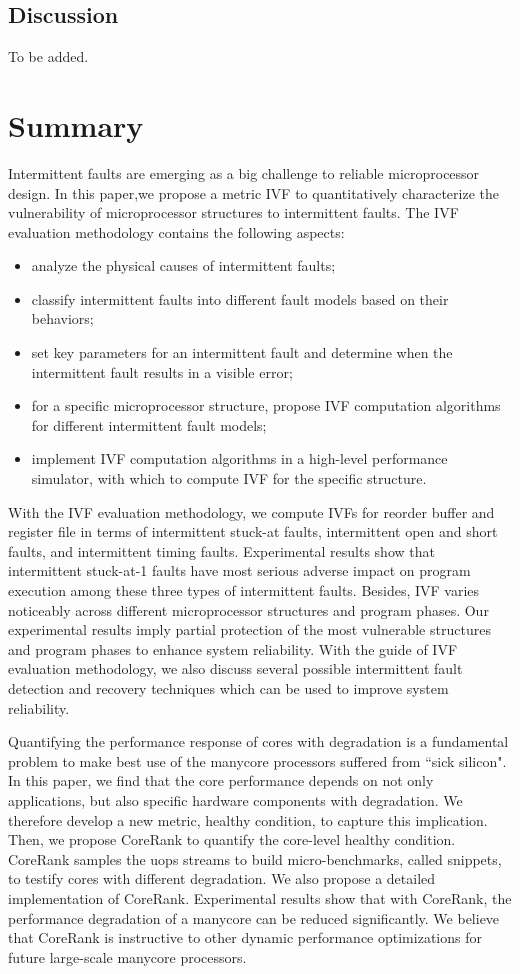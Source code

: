 \subsection{Discussion}
To be added.

\section{Summary}
Intermittent faults are emerging as a big challenge to reliable microprocessor design. In this paper,we propose a metric IVF to quantitatively characterize the vulnerability of microprocessor structures to intermittent faults. The IVF evaluation methodology contains the following aspects: 
\begin{itemize}
    \item analyze the physical causes of intermittent faults;
    \item classify intermittent faults into different fault models based on their behaviors;
    \item set key parameters for an intermittent fault and determine when the intermittent fault results in a visible error;
    \item for a specific microprocessor structure, propose IVF computation algorithms for different intermittent fault models;
    \item implement IVF computation algorithms in a high-level performance simulator, with which to compute IVF for the specific structure.
\end{itemize}

With the IVF evaluation methodology, we compute IVFs for reorder buffer and register file in terms of intermittent stuck-at faults, intermittent open and short faults, and intermittent timing faults. Experimental results show that intermittent stuck-at-1 faults have most serious adverse impact on program execution among these three types of intermittent faults. Besides, IVF varies noticeably across different microprocessor structures and program phases. Our experimental results imply partial protection of the most vulnerable structures and program phases to enhance system reliability. With the guide of IVF evaluation methodology, we also discuss several possible intermittent fault detection and recovery techniques which can be used to improve system reliability.

Quantifying the performance response of cores with degradation is a fundamental problem to make best use of the manycore processors suffered from ``sick silicon". In this paper, we find that the core performance depends on not only applications, but also specific hardware components with degradation. We therefore develop a new metric, healthy condition, to capture this implication. Then, we propose CoreRank to quantify the core-level healthy condition. CoreRank samples the uops streams to build micro-benchmarks, called snippets,  to testify  cores with different degradation. We also propose a detailed implementation of CoreRank. Experimental results show that with CoreRank, the performance degradation of a manycore can be reduced significantly. We believe that CoreRank is instructive to other dynamic performance optimizations for future large-scale manycore processors.





